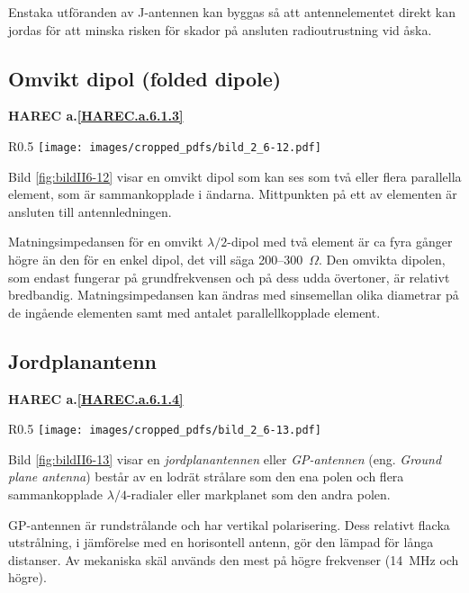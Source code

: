 Enstaka utföranden av J-antennen kan byggas så att antennelementet direkt kan
jordas för att minska risken för skador på ansluten radioutrustning vid åska.

\subsection{Omvikt dipol (folded dipole)}
\textbf{
HAREC a.\ref{HAREC.a.6.1.3}\label{myHAREC.a.6.1.3}
}

\begin{wrapfigure}{R}{0.5\textwidth}
  \texttt{[image: images/cropped\_pdfs/bild\_2\_6-12.pdf]}
  \caption{Omvikt dipol}
  \label{fig:bildII6-12}
\end{wrapfigure}

Bild \ref{fig:bildII6-12} visar en omvikt dipol som kan ses som två eller flera
parallella element, som är sammankopplade i ändarna.
Mittpunkten på ett av elementen är ansluten till antennledningen.

Matningsimpedansen för en omvikt \(\lambda/2\)-dipol med två element är
ca fyra gånger högre än den för en enkel dipol, det vill säga 200--300~\(\Omega\).
Den omvikta dipolen, som endast fungerar på grundfrekvensen och på
dess udda övertoner, är relativt bredbandig.
Matningsimpedansen kan ändras med sinsemellan olika diametrar på de ingående
elementen samt med antalet parallellkopplade element.

\subsection{Jordplanantenn}
\textbf{
HAREC a.\ref{HAREC.a.6.1.4}\label{myHAREC.a.6.1.4}
}

\begin{wrapfigure}{R}{0.5\textwidth}
  \texttt{[image: images/cropped\_pdfs/bild\_2\_6-13.pdf]}
  \caption{GP-antenn}
  \label{fig:bildII6-13}
\end{wrapfigure}

Bild \ref{fig:bildII6-13} visar en \emph{jordplanantennen} eller
\emph{GP-antennen} (eng. \emph{Ground plane antenna}) består av en
lodrät strålare som den ena polen och flera sammankopplade
\(\lambda/4\)-radialer eller markplanet som den andra polen.

GP-antennen är rundstrålande och har vertikal polarisering.
Dess relativt flacka utstrålning, i jämförelse med en horisontell antenn,
gör den lämpad för långa distanser.
Av mekaniska skäl används den mest på högre frekvenser (14~MHz och högre).


